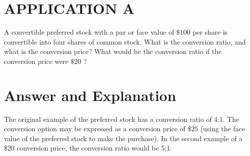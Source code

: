 \documentclass[11pt]{article}
\begin{document}
\section*{APPLICATION A}
A convertible preferred stock with a par or face value of $\$ 100$ per share is convertible into four shares of common stock. What is the conversion ratio, and what is the conversion price? What would be the conversion ratio if the conversion price were $\$ 20$ ?

\section*{Answer and Explanation}
The original example of the preferred stock has a conversion ratio of 4:1. The conversion option may be expressed as a conversion price of $\$ 25$ (using the face value of the preferred stock to make the purchase). In the second example of a $\$ 20$ conversion price, the conversion ratio would be 5:1.
\end{document}
